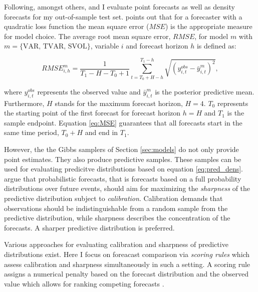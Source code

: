 \documentclass[12pt,letterpaper,fleqn]{article}           %
\begin{document}
Following, amongst others, \textcite{alessandri17} and \textcite{koop13} I evaluate point forecasts as well as density forecasts for my out-of-sample test set. \textcite{weiss96} points out that for a forecaster with a quadratic loss function the mean square error ($MSE$) is the appropriate measure for model choice. The average root mean square error, $RMSE$, for model $m$ with $m=\{\mbox{VAR, TVAR, SVOL}\}$, variable $i$ and forecast horizon $h$ is defined as:

\begin{equation}
RMSE^m_{i,h} = \frac{1}{T_1 - H - T_0 + 1} \sum_{t = T_0 + H - h}^{T_1 - h} \sqrt{(y_{i,t}^{obs} - \bar{y}_{i,t}^m)^2},  
\label{eq:MSE}
\end{equation}

where $y_{i,t}^{obs}$ represents the observed value and $\bar{y}_{i,t}^m$ is the posterior predictive mean. Furthermore, $H$ stands for the maximum forecast horizon, $H = 4$. $T_0$ represents the starting point of the first forecast for forecast horizon $h = H$ and $T_1$ is the sample endpoint.  Equation \eqref{eq:MSE} guarantees that all forecasts start in the same time period, $T_0 + H$ and end in $T_1$.

However, the the Gibbs samplers of Section \ref{sec:models} do not only provide point estimates. They also produce predictive samples. These samples can be used for evaluating predicitve distributions based on equation \eqref{eq:pred_dens}. \textcite{gbr07} argue that probabilistic forecasts, that is forecasts based on a full probability distributions over future events, should aim for maximizing the \textit{sharpness} of the predictive distribution subject to \textit{calibration}. Calibration demands that observations should be indistinguishable from a random sample from the predictive distribution, while sharpness describes the concentration of the forecasts. A sharper predictive distribution is preferred.

Various approaches for evaluating calibration and sharpness of predictive distributions exist. Here I focus on foreacast comparison via \textit{scoring rules} which assess calibration and sharpness simultaneously in such a setting. A scoring rule assigns a numerical penalty based on the forecast distribution and the observed value which allows for ranking competing forecasts \parencite{gneiting07, gneiting14}.
\end{document}
